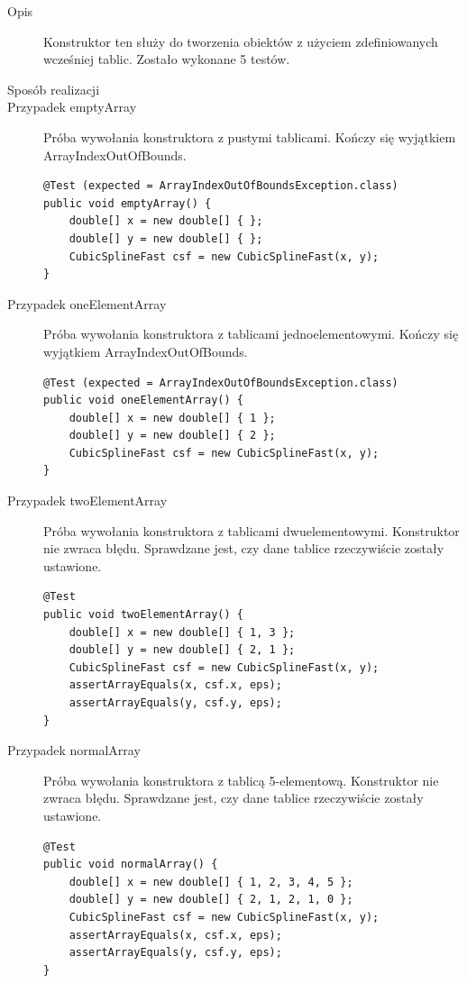 \documentclass[12pt,a4paper,notitlepage]{article}
\begin{document}
\vspace*{5mm}
\begin{description}
\item [Opis] Konstruktor ten służy do tworzenia obiektów z użyciem zdefiniowanych wcześniej tablic. Zostało wykonane 5 testów.
 
\item [Sposób realizacji]
\item [Przypadek emptyArray] Próba wywołania konstruktora z pustymi tablicami. Kończy się wyjątkiem ArrayIndexOutOfBounds.

\begin{lstlisting}
@Test (expected = ArrayIndexOutOfBoundsException.class)
public void emptyArray() {
    double[] x = new double[] { };
    double[] y = new double[] { };
    CubicSplineFast csf = new CubicSplineFast(x, y);
}
\end{lstlisting}

\item [Przypadek oneElementArray] Próba wywołania konstruktora z tablicami jednoelementowymi. Kończy się wyjątkiem ArrayIndexOutOfBounds.

\begin{lstlisting}
@Test (expected = ArrayIndexOutOfBoundsException.class)
public void oneElementArray() {
    double[] x = new double[] { 1 };
    double[] y = new double[] { 2 };
    CubicSplineFast csf = new CubicSplineFast(x, y);
}
\end{lstlisting}

\item [Przypadek twoElementArray] Próba wywołania konstruktora z tablicami dwuelementowymi. Konstruktor nie zwraca błędu. Sprawdzane jest, czy dane tablice rzeczywiście zostały ustawione.

\begin{lstlisting}
@Test
public void twoElementArray() {
    double[] x = new double[] { 1, 3 };
    double[] y = new double[] { 2, 1 };
    CubicSplineFast csf = new CubicSplineFast(x, y);
    assertArrayEquals(x, csf.x, eps);
    assertArrayEquals(y, csf.y, eps);
}
\end{lstlisting}

\item [Przypadek normalArray] Próba wywołania konstruktora z tablicą 5-elementową. Konstruktor nie zwraca błędu. Sprawdzane jest, czy dane tablice rzeczywiście zostały ustawione.

\begin{lstlisting}
@Test
public void normalArray() {
    double[] x = new double[] { 1, 2, 3, 4, 5 };
    double[] y = new double[] { 2, 1, 2, 1, 0 };
    CubicSplineFast csf = new CubicSplineFast(x, y);
    assertArrayEquals(x, csf.x, eps);
    assertArrayEquals(y, csf.y, eps);
}
\end{lstlisting}


\end{description}
\end{document}
